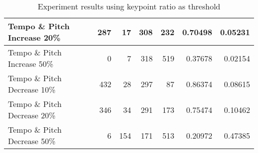 \begin{table}[H]
\begin{tabular}{|l|r|r|r|r|r|r|}
        Tempo  \& Pitch Increase 20\% & 287         & 17          & 308         & 232         & 0.70498           & 0.05231          \\ \hline
        Tempo  \& Pitch Increase 50\% & 0           & 7           & 318         & 519         & 0.37678           & 0.02154          \\ \hline
        Tempo  \& Pitch Decrease 10\% & 432         & 28          & 297         & 87          & 0.86374           & 0.08615          \\ \hline
        Tempo  \& Pitch Decrease 20\% & 346         & 34          & 291         & 173         & 0.75474           & 0.10462          \\ \hline
        Tempo  \& Pitch Decrease 50\% & 6           & 154         & 171         & 513         & 0.20972           & 0.47385          \\ \hline
    \end{tabular}

\caption{Experiment results using keypoint ratio as threshold}
\label{tab:test_results_keypoint_ratio}
\end{table}
